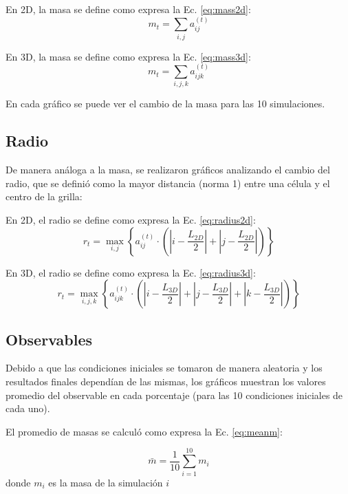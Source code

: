 En 2D, la masa se define como expresa la Ec. \ref{eq:mass2d}:
\begin{equation}
    \label{eq:mass2d}
    m_t = \sum_{i,j}{a^{(t)}_{ij}}
\end{equation}

En 3D, la masa se define como expresa la Ec. \ref{eq:mass3d}:
\begin{equation}
    \label{eq:mass3d}
    m_t = \sum_{i,j,k}{a^{(t)}_{ijk}}
\end{equation}

En cada gráfico se puede ver el cambio de la masa para las 10 simulaciones.

\subsection{Radio}
De manera análoga a la masa, se realizaron gráficos analizando el cambio del radio, que se definió como la mayor distancia (norma 1) entre una célula y el centro de la grilla:

En 2D, el radio se define como expresa la Ec. \ref{eq:radius2d}:
\begin{equation}
    \label{eq:radius2d}
    r_t = \max_{i,j}{\left\{ a^{(t)}_{ij} \cdot \left( \left| i - \frac{L_{2D}}{2} \right| + \left| j - \frac{L_{2D}}{2} \right| \right) \right\}}
\end{equation}


En 3D, el radio se define como expresa la Ec. \ref{eq:radius3d}:
\begin{equation}
    \label{eq:radius3d}
    r_t = \max_{i,j,k}{\left\{ a^{(t)}_{ijk} \cdot \left( \left| i - \frac{L_{3D}}{2} \right| + \left| j - \frac{L_{3D}}{2} \right| + \left| k - \frac{L_{3D}}{2} \right| \right) \right\}}
\end{equation}


\subsection{Observables}
Debido a que las condiciones iniciales se tomaron de manera aleatoria y los resultados finales dependían de las mismas, los gráficos muestran los valores promedio del observable en cada porcentaje (para las 10 condiciones iniciales de cada uno).

El promedio de masas se calculó como expresa la Ec. \ref{eq:meanm}:

\begin{equation}
    \label{eq:meanm}
    \bar{m} = \frac{1}{10} \sum_{i=1}^{10} m_i
\end{equation}
donde $m_i$ es la masa de la simulación $i$

